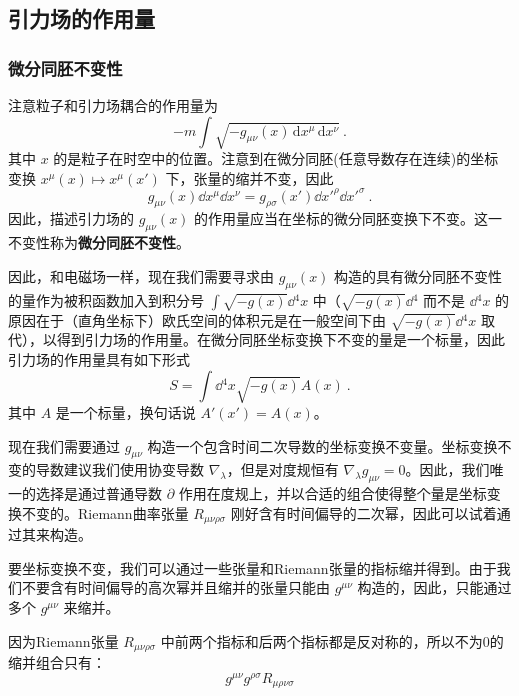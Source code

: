 \subsection{引力场的作用量}

\subsubsection{微分同胚不变性}
注意粒子和引力场耦合的作用量为
\begin{equation}
-m\int\sqrt{-g_{\mu\nu}(x) \,\mathrm{d}{x} ^\mu \,\mathrm{d}{x} ^\nu}~.
\end{equation}
其中 $x$ 的是粒子在时空中的位置。注意到在微分同胚(任意导数存在连续)的坐标变换 $x^\mu(x) \mapsto x^\mu(x')$ 下，张量的缩并不变，因此
\begin{equation}
g_{\mu\nu}(x) \dd x^\mu \dd{x} ^\nu=g_{\rho\sigma}(x') \dd{x'} ^\rho \dd{x'} ^{\sigma}~.
\end{equation}
因此，描述引力场的 $g_{\mu\nu}(x)$ 的作用量应当在坐标的微分同胚变换下不变。这一不变性称为\textbf{微分同胚不变性}。

因此，和电磁场一样，现在我们需要寻求由 $g_{\mu\nu}(x)$ 构造的具有微分同胚不变性的量作为被积函数加入到积分号 $\int\sqrt{-g(x)}\dd{}^4x$ 中（$\sqrt{-g(x)}\dd{}^4$ 而不是 $\dd{}^4x$ 的原因在于（直角坐标下）欧氏空间的体积元是在一般空间下由 $\sqrt{-g(x)}\dd{}^4 x$ 取代），以得到引力场的作用量。在微分同胚坐标变换下不变的量是一个标量，因此引力场的作用量具有如下形式
\begin{equation}
S=\int\dd{}^4x\sqrt{-g(x)}A(x)~.
\end{equation}
其中 $A$ 是一个标量，换句话说 $A'(x')=A(x)$。

现在我们需要通过 $g_{\mu\nu}$ 构造一个包含时间二次导数的坐标变换不变量。坐标变换不变的导数建议我们使用协变导数 $\nabla_\lambda$，但是对度规恒有 $\nabla_\lambda g_{\mu\nu}=0$。因此，我们唯一的选择是通过普通导数 $\partial$ 作用在度规上，并以合适的组合使得整个量是坐标变换不变的。Riemann曲率张量 $R_{\mu\nu\rho\sigma}$ 刚好含有时间偏导的二次幂，因此可以试着通过其来构造。

要坐标变换不变，我们可以通过一些张量和Riemann张量的指标缩并得到。由于我们不要含有时间偏导的高次幂并且缩并的张量只能由 $g^{\mu\nu}$ 构造的，因此，只能通过多个 $g^{\mu\nu}$ 来缩并。

因为Riemann张量 $R_{\mu\nu\rho\sigma}$ 中前两个指标和后两个指标都是反对称的，所以不为0的缩并组合只有：
\begin{equation}
g^{\mu\nu}g^{\rho\sigma}R_{\mu\rho\nu\sigma}
\end{equation}





























